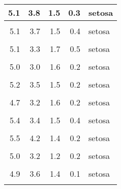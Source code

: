 \documentclass[
]{article}
\begin{document}
\begin{table}
\begin{tabular}[t]{r|r|r|r|l}
\hline
5.1 & 3.8 & 1.5 & 0.3 & setosa\\
\hline
\cellcolor{gray!6}{5.4} & \cellcolor{gray!6}{3.4} & \cellcolor{gray!6}{1.7} & \cellcolor{gray!6}{0.2} & \cellcolor{gray!6}{setosa}\\
\hline
5.1 & 3.7 & 1.5 & 0.4 & setosa\\
\hline
\cellcolor{gray!6}{4.6} & \cellcolor{gray!6}{3.6} & \cellcolor{gray!6}{1.0} & \cellcolor{gray!6}{0.2} & \cellcolor{gray!6}{setosa}\\
\hline
5.1 & 3.3 & 1.7 & 0.5 & setosa\\
\hline
\cellcolor{gray!6}{4.8} & \cellcolor{gray!6}{3.4} & \cellcolor{gray!6}{1.9} & \cellcolor{gray!6}{0.2} & \cellcolor{gray!6}{setosa}\\
\hline
5.0 & 3.0 & 1.6 & 0.2 & setosa\\
\hline
\cellcolor{gray!6}{5.0} & \cellcolor{gray!6}{3.4} & \cellcolor{gray!6}{1.6} & \cellcolor{gray!6}{0.4} & \cellcolor{gray!6}{setosa}\\
\hline
5.2 & 3.5 & 1.5 & 0.2 & setosa\\
\hline
\cellcolor{gray!6}{5.2} & \cellcolor{gray!6}{3.4} & \cellcolor{gray!6}{1.4} & \cellcolor{gray!6}{0.2} & \cellcolor{gray!6}{setosa}\\
\hline
4.7 & 3.2 & 1.6 & 0.2 & setosa\\
\hline
\cellcolor{gray!6}{4.8} & \cellcolor{gray!6}{3.1} & \cellcolor{gray!6}{1.6} & \cellcolor{gray!6}{0.2} & \cellcolor{gray!6}{setosa}\\
\hline
5.4 & 3.4 & 1.5 & 0.4 & setosa\\
\hline
\cellcolor{gray!6}{5.2} & \cellcolor{gray!6}{4.1} & \cellcolor{gray!6}{1.5} & \cellcolor{gray!6}{0.1} & \cellcolor{gray!6}{setosa}\\
\hline
5.5 & 4.2 & 1.4 & 0.2 & setosa\\
\hline
\cellcolor{gray!6}{4.9} & \cellcolor{gray!6}{3.1} & \cellcolor{gray!6}{1.5} & \cellcolor{gray!6}{0.2} & \cellcolor{gray!6}{setosa}\\
\hline
5.0 & 3.2 & 1.2 & 0.2 & setosa\\
\hline
\cellcolor{gray!6}{5.5} & \cellcolor{gray!6}{3.5} & \cellcolor{gray!6}{1.3} & \cellcolor{gray!6}{0.2} & \cellcolor{gray!6}{setosa}\\
\hline
4.9 & 3.6 & 1.4 & 0.1 & setosa\\
\hline
\cellcolor{gray!6}{4.4} & \cellcolor{gray!6}{3.0} & \cellcolor{gray!6}{1.3} & \cellcolor{gray!6}{0.2} & \cellcolor{gray!6}{setosa}\\

\end{tabular}
\end{table}
\end{document}
